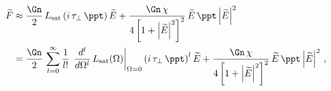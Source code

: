 \begin{equation} %
    \begin{split}
        \widetilde{F} &\approx \frac{\Gn}{2}\, L_\mathrm{sat}\left(i\, \tau_\perp\, \ppt\right) \widetilde{E} + \frac{\Gn\, \chi}{4 \left[1 + \left|\widetilde{E}\right|^2\right]^2}\, \widetilde{E}\, \ppt \left|\widetilde{E}\right|^2 \\
        &= \frac{\Gn}{2}\, \sum_{l = 0}^\infty \frac{1}{l!}\, \left. \frac{d^l}{d \Omega^l}\, L_\mathrm{sat}(\Omega)\right|_{\Omega = 0} \left(i\, \tau_\perp\, \ppt\right)^l \widetilde{E} + \frac{\Gn\, \chi}{4 \left[1 + \left|\widetilde{E}\right|^2\right]^2}\, \widetilde{E}\, \ppt \left|\widetilde{E}\right|^2\, ,
    \end{split}
\end{equation}
